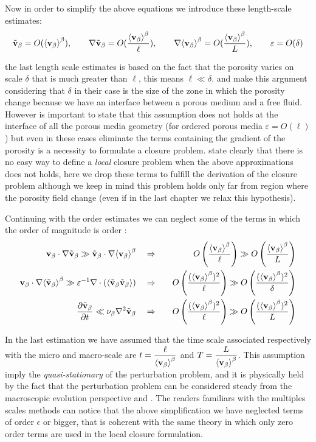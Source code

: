 Now in order to simplify the above equations we introduce these length-scale estimates:
$$ \tilde{\textbf{v}}_{\beta} = O({\left< \textbf{v}_{\beta} \right>}^{\beta}), \qquad \nabla\tilde{\textbf{v}}_{\beta} = O(\dfrac{{\left< \textbf{v}_{\beta} \right>}^{\beta}}{\ell}), \qquad  \nabla {\left< \textbf{v}_{\beta}\right>}^{\beta} = O(\dfrac{{\left< \textbf{v}_{\beta} \right>}^{\beta}}{L}), \qquad \varepsilon = O(\delta) $$

the last length scale estimates is based on the fact that the porosity varies on scale $\delta$ that is much greater than $\ell$, this means $\ell \ll \delta$. \citet{valdes2013velocity} and \citet{ochoa1995momentum} make this argument considering that $\delta$ in their case is the size of the zone in which the porosity change because we have an interface between a porous medium and a free fluid.
However is important to state that this assumption does not holds at the interface of all the porous media geometry (for ordered porous media $\varepsilon = O(\ell)$) but even in these cases eliminate the terms containing the gradient of the porosity is a necessity to formulate a closure problem.
\citet{whitaker1996forchheimer} state clearly that there is no easy way to define a \textit{local} closure problem when the above approximations does not holds, here we drop these terms to fulfill the derivation of the closure problem although we keep in mind this problem holds only far from region where the porosity field change (even if in the last chapter we relax this hypothesis).

Continuing with the order estimates we can neglect some of the terms in which the order of magnitude is order :
\begin{eqnarray}
\textbf{v}_{\beta} \cdot \nabla \tilde{\textbf{v}}_{\beta} \gg \tilde{\textbf{v}}_{\beta} \cdot \nabla {\left< \textbf{v}_{\beta}\right>}^{\beta} \quad &\Rightarrow&  \quad O\left(\dfrac{{\left< \textbf{v}_{\beta} \right>}^{\beta}}{\ell}\right) \gg O\left(\dfrac{{\left< \textbf{v}_{\beta} \right>}^{\beta}}{L} \right) \\
\textbf{v}_{\beta} \cdot \nabla {\left< \tilde{\textbf{v}}_{\beta}\right>}^{\beta} \gg  \varepsilon^{-1} \nabla \cdot \left({\left< \tilde{\textbf{v}}_{\beta} \tilde{\textbf{v}}_{\beta} \right>}\right)  \quad &\Rightarrow& \quad O\left(\dfrac{({\left< \textbf{v}_{\beta} \right>}^{\beta})^2}{\ell}\right) \gg O\left(\dfrac{({\left< \textbf{v}_{\beta} \right>}^{\beta})^2}{\delta} \right) \\
\dfrac{\partial \tilde{\textbf{v}}_{\beta}}{\partial t} \ll \nu_{\beta} \nabla^2 \tilde{\textbf{v}}_{\beta}  \quad &\Rightarrow&  \quad O\left(\dfrac{({\left< \textbf{v}_{\beta} \right>}^{\beta})^2}{\ell}\right) \gg O\left(\dfrac{({\left< \textbf{v}_{\beta} \right>}^{\beta})^2}{L} \right) 
\end{eqnarray}

In the last estimation we have assumed that the time scale associated respectively with the micro and macro-scale are $t = \dfrac{\ell}{{\left< \textbf{v}_{\beta} \right>}^{\beta}}$ and $T =\dfrac{L}{{\left< \textbf{v}_{\beta} \right>}^{\beta}}$.
This assumption imply the \textit{quasi-stationary} of the perturbation problem, and it is physically held by the fact that the perturbation problem can be considered steady from the macroscopic evolution perspective \citet{davit2013homogenization} and \citet{zhu2014study}.
The readers familiars with the multiples scales methods can notice that the above simplification we have neglected terms of order $\epsilon$ or bigger, that is coherent with the same theory in which only zero order terms are used in the local closure formulation.

